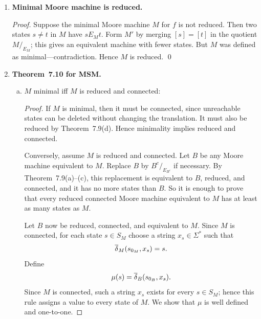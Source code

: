 \begin{enumerate}[{7.}1.]
\begin{enumerate}[(a)]
  \item If $M$ connected, $M/_{E_M}$ connected:

  \begin{proof}
  Let $[t]_{E_M}$ be any state of the quotient.  Since $M$ is connected, there
  exists $x\in\Sigma^*$ with $\DBAR_M(s_0,x)=t$.  By induction on $|x|$,
  \[
    \DBAR_{E_M}([s_0]_{E_M},x)=[\DBAR_M(s_0,x)]_{E_M}=[t]_{E_M}.
  \]
  Thus every quotient state is reachable, so the quotient is connected.
  \end{proof}
\end{enumerate}

\item \textbf{Minimal Moore machine is reduced.}

\begin{proof}
Suppose the minimal Moore machine $M$ for $f$ is not reduced.  Then two states $s\neq t$ in $M$ have $s E_M t$.  Form $M'$ by merging $[s]=[t]$ in the quotient $M/_{E_M}$; this gives an equivalent machine with fewer states.  But $M$ was defined as minimal---contradiction.  Hence $M$ is reduced. \qed
\end{proof}

\item \textbf{Theorem~7.10 for MSM.}

\begin{enumerate}[(a)]
  \item $M$ minimal iff $M$ is reduced and connected:

  \begin{proof}
  If $M$ is minimal, then it must be connected, since unreachable states can be
  deleted without changing the translation.  It must also be reduced by
  Theorem~7.9(d).  Hence minimality implies reduced and connected.

  Conversely, assume $M$ is reduced and connected.  Let $B$ be any Moore machine
  equivalent to $M$.  Replace $B$ by $B^c/_{E_{B^c}}$ if necessary.  By
  Theorem~7.9(a)--(c), this replacement is equivalent to $B$, reduced, and
  connected, and it has no more states than $B$.  So it is enough to prove that
  every reduced connected Moore machine equivalent to $M$ has at least as many
  states as $M$.

  Let $B$ now be reduced, connected, and equivalent to $M$.  Since $M$ is
  connected, for each state $s\in S_M$ choose a string $x_s\in\Sigma^*$ such
  that
  \[
    \overline{\delta}_M(s_{0_M},x_s)=s.
  \]
  Define
  \[
    \mu(s)=\overline{\delta}_B(s_{0_B},x_s).
  \]
  Since $M$ is connected, such a string $x_s$ exists for every $s\in S_M$; hence
  this rule assigns a value to every state of $M$.  We show that $\mu$ is well
  defined and one-to-one.


\end{proof}
\end{enumerate}
\end{enumerate}
